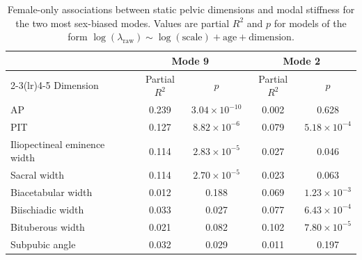 \documentclass[openacc]{rsproca_new}
\begin{document}
\begin{table}
\caption{Female-only associations between static pelvic dimensions and modal stiffness for the two most sex-biased modes. Values are partial $R^2$ and $p$ for models of the form $\log(\lambda_{\mathrm{raw}}) \sim \log(\mathrm{scale}) + \mathrm{age} + \mathrm{dimension}$.}
\label{tab:pelvimetry}
\centering
\begin{tabular}{lcccc}
\toprule
& \multicolumn{2}{c}{Mode 9} & \multicolumn{2}{c}{Mode 2} \\
\cmidrule(lr){2-3}\cmidrule(lr){4-5}
Dimension & Partial $R^2$ & $p$ & Partial $R^2$ & $p$ \\
\midrule
AP & 0.239 & $3.04 \times 10^{-10}$ & 0.002 & 0.628 \\
PIT & 0.127 & $8.82 \times 10^{-6}$ & 0.079 & $5.18 \times 10^{-4}$ \\
Iliopectineal eminence width & 0.114 & $2.83 \times 10^{-5}$ & 0.027 & 0.046 \\
Sacral width & 0.114 & $2.70 \times 10^{-5}$ & 0.023 & 0.063 \\
Biacetabular width & 0.012 & 0.188 & 0.069 & $1.23 \times 10^{-3}$ \\
Biischiadic width & 0.033 & 0.027 & 0.077 & $6.43 \times 10^{-4}$ \\
Bituberous width & 0.021 & 0.082 & 0.102 & $7.80 \times 10^{-5}$ \\
Subpubic angle & 0.032 & 0.029 & 0.011 & 0.197 \\
\bottomrule
\end{tabular}
\end{table}
\end{document}
